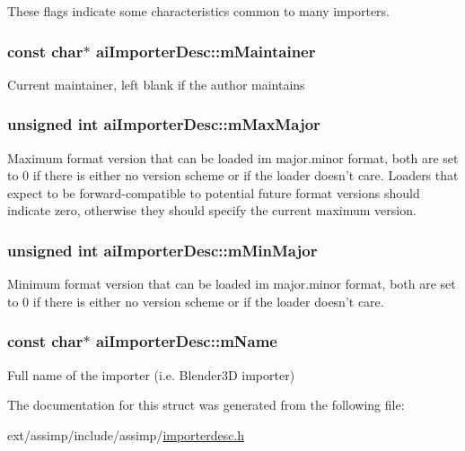 These flags indicate some characteristics common to many importers. \hypertarget{structai_importer_desc_a53bf0ecb36ce0b97018b4b6bd2748f02}{
\subsubsection[{m\-Maintainer}]{\setlength{\rightskip}{0pt plus 5cm}const char$\ast$ ai\-Importer\-Desc\-::m\-Maintainer}}\label{structai_importer_desc_a53bf0ecb36ce0b97018b4b6bd2748f02}
Current maintainer, left blank if the author maintains \hypertarget{structai_importer_desc_a9d33eac3be20f7f4630f838a228ada63}{
\subsubsection[{m\-Max\-Major}]{\setlength{\rightskip}{0pt plus 5cm}unsigned int ai\-Importer\-Desc\-::m\-Max\-Major}}\label{structai_importer_desc_a9d33eac3be20f7f4630f838a228ada63}
Maximum format version that can be loaded im major.\-minor format, both are set to 0 if there is either no version scheme or if the loader doesn't care. Loaders that expect to be forward-\/compatible to potential future format versions should indicate zero, otherwise they should specify the current maximum version. \hypertarget{structai_importer_desc_aee34d348f522807f0a36607664e92a57}{
\subsubsection[{m\-Min\-Major}]{\setlength{\rightskip}{0pt plus 5cm}unsigned int ai\-Importer\-Desc\-::m\-Min\-Major}}\label{structai_importer_desc_aee34d348f522807f0a36607664e92a57}
Minimum format version that can be loaded im major.\-minor format, both are set to 0 if there is either no version scheme or if the loader doesn't care. \hypertarget{structai_importer_desc_a2a9d5fd818c01bba1a0a782722ab9495}{
\subsubsection[{m\-Name}]{\setlength{\rightskip}{0pt plus 5cm}const char$\ast$ ai\-Importer\-Desc\-::m\-Name}}\label{structai_importer_desc_a2a9d5fd818c01bba1a0a782722ab9495}
Full name of the importer (i.\-e. Blender3\-D importer) 

The documentation for this struct was generated from the following file\-:\begin{DoxyCompactItemize}
\item 
ext/assimp/include/assimp/\hyperlink{importerdesc_8h}{importerdesc.\-h}\end{DoxyCompactItemize}

